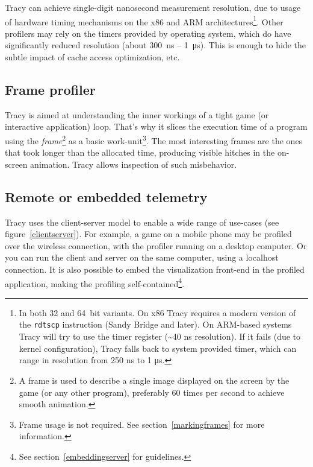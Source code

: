 \documentclass[hidelinks,titlepage,a4paper]{article}
\begin{document}
Tracy can achieve single-digit nanosecond measurement resolution, due to usage of hardware timing mechanisms on the x86 and ARM architectures\footnote{In both 32 and 64~bit variants. On x86 Tracy requires a modern version of the \texttt{rdtscp} instruction (Sandy Bridge and later). On ARM-based systems Tracy will try to use the timer register (\textasciitilde 40 \si{\nano\second} resolution). If it fails (due to kernel configuration), Tracy falls back to system provided timer, which can range in resolution from 250 \si{\nano\second} to 1 \si{\micro\second}.}. Other profilers may rely on the timers provided by operating system, which do have significantly reduced resolution (about 300~\si{\nano\second} -- 1~\si{\micro\second}). This is enough to hide the subtle impact of cache access optimization, etc.

\subsection{Frame profiler}

Tracy is aimed at understanding the inner workings of a tight game (or interactive application) loop. That's why it slices the execution time of a program using the \emph{frame}\footnote{A frame is used to describe a single image displayed on the screen by the game (or any other program), preferably 60 times per second to achieve smooth animation.} as a basic work-unit\footnote{Frame usage is not required. See section~\ref{markingframes} for more information.}. The most interesting frames are the ones that took longer than the allocated time, producing visible hitches in the on-screen animation. Tracy allows inspection of such misbehavior.

\subsection{Remote or embedded telemetry}

Tracy uses the client-server model to enable a wide range of use-cases (see figure~\ref{clientserver}). For example, a game on a mobile phone may be profiled over the wireless connection, with the profiler running on a desktop computer. Or you can run the client and server on the same computer, using a localhost connection. It is also possible to embed the visualization front-end in the profiled application, making the profiling self-contained\footnote{See section~\ref{embeddingserver} for guidelines.}.
\end{document}

